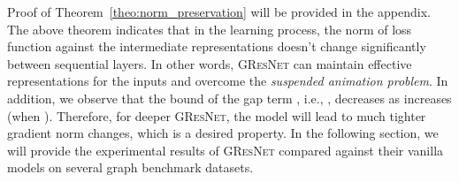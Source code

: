 \documentclass{article}
\newcommand{\gresnet}{\textsc{GResNet}}
\begin{document}
Proof of Theorem~\ref{theo:norm_preservation} will be provided in the appendix. The above theorem indicates that in the learning process, the norm of loss function against the intermediate representations doesn't change significantly between sequential layers. In other words, {\gresnet} can maintain effective representations for the inputs and overcome the \textit{suspended animation problem}. In addition, we observe that the bound of the gap term , i.e., , decreases as  increases (when ). Therefore, for deeper {\gresnet}, the model will lead to much tighter gradient norm changes, which is a desired property. In the following section, we will provide the experimental results of {\gresnet} compared against their vanilla models on several graph benchmark datasets.
\end{document}
